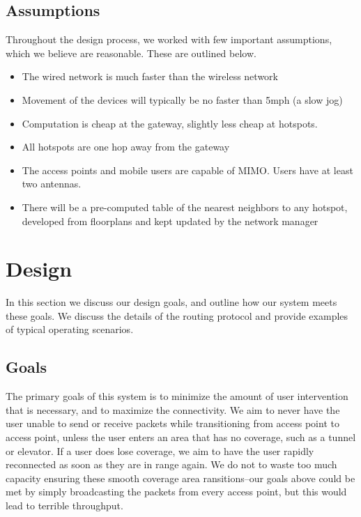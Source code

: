 \documentclass[letterpaper,12pt]{article}
\begin{document}
\subsection{Assumptions}

Throughout the design process, we worked with few important assumptions, which
we believe are reasonable. These are outlined below.

\begin{itemize}
\item The wired network is much faster than the wireless network
\item Movement of the devices will typically be no faster than 5mph (a slow jog)
\item Computation is cheap at the gateway, slightly less cheap at hotspots.
\item All hotspots are one hop away from the gateway
\item The access points and mobile users are capable of MIMO. Users have at 
least two antennas. 
\item There will be a pre-computed table of the nearest neighbors to any 
hotspot, developed from floorplans and kept updated by the network manager
\end{itemize}

\section{Design} \label{sec:design}

In this section we discuss our design goals, and outline how our system
meets these goals. We discuss the details of the routing protocol and provide 
examples of typical operating scenarios.

\subsection{Goals}
The primary goals of this system is to minimize the amount of user 
intervention that is necessary, and to maximize the connectivity.
We aim to never have the user unable to send or receive packets while 
transitioning from access point to access point, unless the user enters an area
that has no coverage, such as a tunnel or elevator. If a user does lose coverage,
we aim to have the user rapidly reconnected as soon as they are in range again.
We do not to waste too much capacity ensuring these smooth coverage area 
ransitions--our goals above could be met by simply broadcasting the packets
from every access point, but this would lead to terrible throughput.
\end{document}
